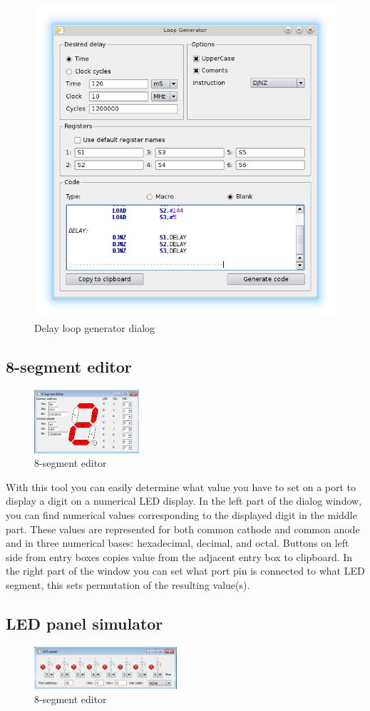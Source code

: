         \begin{figure}[h]
            \centering
            \includegraphics[width=.6\textwidth]{img/loop_gen.png}
            \caption{Delay loop generator dialog}
        \end{figure}

    \clearpage
    \subsection{8-segment editor}
        \begin{figure}
            \centering
            \includegraphics[width=110pt]{img/8segment.png}
            \caption{8-segment editor}
        \end{figure}
        With this tool you can easily determine what value you have to set on a port to display a digit on a numerical LED
        display. In the left part of the dialog window, you can find numerical values corresponding to the displayed digit
        in the middle part. These values are represented for both common cathode and common anode and in three numerical
        bases: hexadecimal, decimal, and octal. Buttons on left side from entry boxes copies value from the adjacent entry
        box to clipboard. In the right part of the window you can set what port pin is connected to what LED segment, this
        sets permutation of the resulting value(s).

    \subsection{LED panel simulator}
        \begin{figure}
            \centering
            \includegraphics[width=150pt]{img/Led_panel.png}
            \caption{8-segment editor}
        \end{figure}

